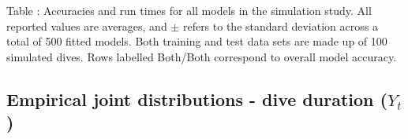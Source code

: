 \documentclass{article}
\begin{document}
        \noindent Table : Accuracies and run times for all models in the simulation study. All reported values are averages, and $\pm$ refers to the standard deviation across a total of 500 fitted models. Both training and test data sets are made up of 100 simulated dives. Rows labelled Both/Both correspond to overall model accuracy.
        \addtocounter{tablenum}{1}

    \newpage
    \subsection{Empirical joint distributions - dive duration ($Y_t$)}

        \begin{center}
\end{center}
\end{document}
